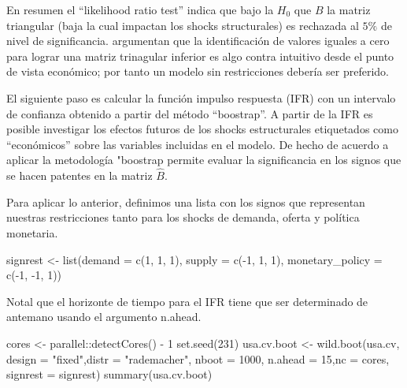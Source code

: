 \documentclass[
]{book}
\newenvironment{Shaded}{\begin{snugshade}}{\end{snugshade}}
\newcommand{\AttributeTok}[1]{\textcolor[rgb]{0.77,0.63,0.00}{#1}}
\newcommand{\DecValTok}[1]{\textcolor[rgb]{0.00,0.00,0.81}{#1}}
\newcommand{\FunctionTok}[1]{\textcolor[rgb]{0.00,0.00,0.00}{#1}}
\newcommand{\NormalTok}[1]{#1}
\newcommand{\OtherTok}[1]{\textcolor[rgb]{0.56,0.35,0.01}{#1}}
\newcommand{\SpecialCharTok}[1]{\textcolor[rgb]{0.00,0.00,0.00}{#1}}
\newcommand{\StringTok}[1]{\textcolor[rgb]{0.31,0.60,0.02}{#1}}
\begin{document}
En resumen el ``likelihood ratio test'' indica que bajo la \(H_{0}\)
que \(B\) la matriz triangular (baja la cual impactan los shocks structurales) es rechazada al \(5\%\) de nivel de significancia. \citet{Herwartz2016} argumentan que la identificación de valores iguales a cero para lograr una matriz trinagular inferior es algo contra intuitivo desde el punto de vista económico; por tanto un modelo sin restricciones debería ser preferido.

El siguiente paso es calcular la función impulso respuesta (IFR) con un intervalo de confianza obtenido a partir del método ``boostrap''. A partir de la IFR es posible investigar los efectos futuros de los shocks estructurales etiquetados como ``económicos'' sobre las variables
incluidas en el modelo. De hecho de acuerdo a \citet{Herwartz18} aplicar la metodología "boostrap permite evaluar la significancia en los signos que se hacen patentes en la matriz \(\hat{B}\).

Para aplicar lo anterior, definimos una lista con los signos que representan nuestras restricciones tanto para los shocks de demanda, oferta y política monetaria.

\begin{Shaded}
\begin{Highlighting}[]
\NormalTok{signrest }\OtherTok{\textless{}{-}} \FunctionTok{list}\NormalTok{(}\AttributeTok{demand =} \FunctionTok{c}\NormalTok{(}\DecValTok{1}\NormalTok{, }\DecValTok{1}\NormalTok{, }\DecValTok{1}\NormalTok{), }\AttributeTok{supply =} \FunctionTok{c}\NormalTok{(}\SpecialCharTok{{-}}\DecValTok{1}\NormalTok{, }\DecValTok{1}\NormalTok{, }\DecValTok{1}\NormalTok{), }\AttributeTok{monetary\_policy =} \FunctionTok{c}\NormalTok{(}\SpecialCharTok{{-}}\DecValTok{1}\NormalTok{, }\SpecialCharTok{{-}}\DecValTok{1}\NormalTok{, }\DecValTok{1}\NormalTok{))}
\end{Highlighting}
\end{Shaded}

Notal que el horizonte de tiempo para el IFR tiene que ser determinado de antemano usando el argumento n.ahead.

\begin{Shaded}
\begin{Highlighting}[]
\NormalTok{cores }\OtherTok{\textless{}{-}}\NormalTok{ parallel}\SpecialCharTok{::}\FunctionTok{detectCores}\NormalTok{() }\SpecialCharTok{{-}} \DecValTok{1}
\FunctionTok{set.seed}\NormalTok{(}\DecValTok{231}\NormalTok{)}
\NormalTok{usa.cv.boot }\OtherTok{\textless{}{-}} \FunctionTok{wild.boot}\NormalTok{(usa.cv, }\AttributeTok{design =} \StringTok{"fixed"}\NormalTok{,}\AttributeTok{distr =} \StringTok{"rademacher"}\NormalTok{, }\AttributeTok{nboot =} \DecValTok{1000}\NormalTok{, }\AttributeTok{n.ahead =} \DecValTok{15}\NormalTok{,}\AttributeTok{nc =}\NormalTok{ cores, }\AttributeTok{signrest =}\NormalTok{ signrest)}
\FunctionTok{summary}\NormalTok{(usa.cv.boot)}
\end{Highlighting}
\end{Shaded}
\end{document}
